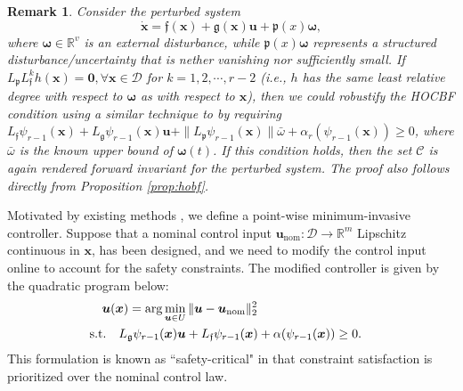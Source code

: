 \documentclass[letterpaper, 10 pt, journal, twoside]{IEEEtran}
\theoremstyle{plain}
\newtheorem{remark}{Remark}
\newcommand{\myvar}[1]{\bm{#1}}
\newcommand{\myset}[1]{\mathscr{#1}}
\begin{document}
\begin{remark}
Consider the perturbed system
\begin{equation}
    \dot{\myvar{x}} = \mathfrak{f}(\myvar{x}) + \mathfrak{g}(\myvar{x}) \myvar{u} + \mathfrak{p}(x)\myvar{\omega},
\end{equation}
where  $\myvar{\omega} \in \mathbb{R}^{v}$ is  an external disturbance, while $  \mathfrak{p}(x)\myvar{\omega}$ represents a structured disturbance/uncertainty that is nether vanishing nor sufficiently small. If $        L_{\mathfrak{p}} L_{\mathfrak{f}}^k h(\myvar{x}) = \myvar{0},  \forall \myvar{x} \in \myset{D} $ for  $k=1,2,\cdots,r-2$ (i.e., $h$ has the same least relative degree with respect to $\myvar{\omega}$ as with respect to $\myvar{x}$), then we could robustify the HOCBF condition using a similar technique to \cite{jankovic2018robust} by requiring $L_{\mathfrak{f}}\psi_{r-1} (\myvar{x}) 
+ L_{\mathfrak{g}} \psi_{r-1}(\myvar{x}) \myvar{u} + \| L_{\mathfrak{p}} \psi_{r-1}(\myvar{x}) \| \bar{\omega}  + \alpha_r(\psi_{r-1}(\myvar{x}))\geq 0$, where $ \bar{\omega}$  is the known upper bound of $\myvar{\omega}(t) $. If this condition holds, then the set $\myset{C}$ is again rendered forward invariant for the perturbed system. The proof also  follows  directly  from  Proposition  \ref{prop:hobf}.
		
\end{remark}

{Motivated by existing methods \cite{Ames2019control}, we define} a point-wise minimum-invasive controller. Suppose that a nominal control input $ \myvar{u}_{\text{nom}}: \myset{D} \to \mathbb{R}^m$ Lipschitz continuous in $ \myvar{x} $, has been designed, and we need to modify the control input online to account for the safety constraints. {T}he modified controller is given by the quadratic program below:
\begin{equation} \label{eq:controllerQP}
\begin{aligned}
& \myvar{u}(\myvar{x}) = \arg   \min_{\myvar{u} \in U }\|\myvar{u} - \myvar{u}_{\text{nom}}\|_2^2 \\
   & \hspace{-10pt} \text{s.t.} \quad L_{\mathfrak{g}} \psi_{r-1}( \myvar{x}) \myvar{u}  + L_{\mathfrak{f}} \psi_{r-1}(\myvar{x}) + \alpha(\psi_{r-1}(\myvar{x}))\ge 0.
\end{aligned}
\end{equation}
  This formulation is known as ``safety-critical" in that constraint satisfaction is prioritized over the nominal control law.
\end{document}
